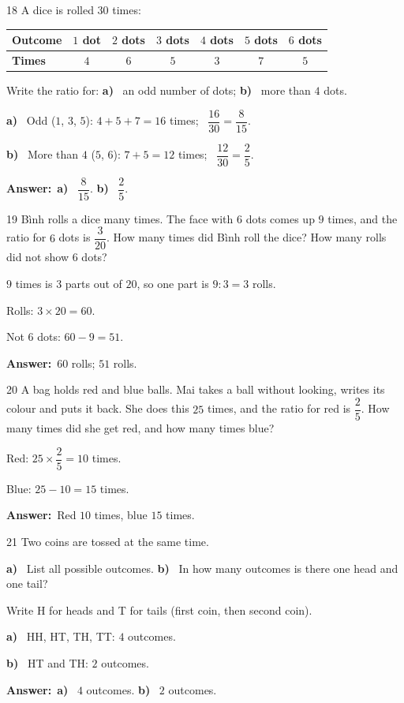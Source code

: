 \documentclass[11pt]{article}
\newif\ifsol \solfalse
\providecommand{\AnsWord}{Đáp số}
\newcommand{\dapso}[1]{\par\textbf{\AnsWord:}\ #1}
\newcommand{\probsol}[1]{%
  \begin{lrbox}{\solmeasure}\begin{minipage}{\dimexpr\linewidth-24pt\relax}#1\end{minipage}\end{lrbox}%
  \ifsol
    \begin{solbox}#1\end{solbox}%
  \else
    \setlength{\solht}{\dimexpr\ht\solmeasure+\dp\solmeasure+0.85cm\relax}%
    \ifdim\solht<1.35cm\setlength{\solht}{1.35cm}\fi
    \begin{tcolorbox}[colback=white,colframe=Line,boxrule=0.8pt,arc=5pt,
      left=8pt,right=8pt,top=4pt,bottom=4pt,height=\solht]{\footnotesize\color{Slate}\itshape\WorkWord}\end{tcolorbox}%
  \fi}
\newcommand{\pa}[1]{\textbf{#1)}\ }
\newcommand{\gap}{\vspace{0.3cm}}
\def\WorkWord{Your work:}
\def\AnsWord{Answer}
\begin{document}
\gap
\needspace{5cm}
\begin{probbox}{18}{\relax}
A dice is rolled $30$ times:
\begin{center}
\begin{tabular}{|l|c|c|c|c|c|c|}
\hline
\textbf{Outcome} & $1$ dot & $2$ dots & $3$ dots & $4$ dots & $5$ dots & $6$ dots\\\hline
\textbf{Times} & $4$ & $6$ & $5$ & $3$ & $7$ & $5$\\\hline
\end{tabular}
\end{center}
Write the ratio for: \pa{a} an odd number of dots; \quad \pa{b} more than $4$ dots.
\end{probbox}
\probsol{
\pa{a} Odd ($1$, $3$, $5$): $4+5+7=16$ times; \ $\dfrac{16}{30}=\dfrac{8}{15}$.\par
\pa{b} More than $4$ ($5$, $6$): $7+5=12$ times; \ $\dfrac{12}{30}=\dfrac25$.
\dapso{\pa{a} $\dfrac{8}{15}$. \pa{b} $\dfrac25$.}}
\gap
\begin{probbox}{19}{\relax}
Bình rolls a dice many times. The face with $6$ dots comes up $9$ times, and the ratio for $6$ dots is $\dfrac{3}{20}$. How many times did Bình roll the dice? How many rolls did not show $6$ dots?
\end{probbox}
\probsol{
$9$ times is $3$ parts out of $20$, so one part is $9:3=3$ rolls.\par Rolls: $3\times20=60$.\par Not $6$ dots: $60-9=51$.
\dapso{$60$ rolls; $51$ rolls.}}
\gap
\begin{probbox}{20}{\relax}
A bag holds red and blue balls. Mai takes a ball without looking, writes its colour and puts it back. She does this $25$ times, and the ratio for red is $\dfrac25$. How many times did she get red, and how many times blue?
\end{probbox}
\probsol{
Red: $25\times\dfrac25=10$ times.\par Blue: $25-10=15$ times.
\dapso{Red $10$ times, blue $15$ times.}}
\gap
\begin{probbox}{21}{\relax}
Two coins are tossed at the same time.\par
\pa{a} List all possible outcomes. \quad \pa{b} In how many outcomes is there one head and one tail?
\end{probbox}
\probsol{
Write H for heads and T for tails (first coin, then second coin).\par
\pa{a} HH, HT, TH, TT: $4$ outcomes.\par
\pa{b} HT and TH: $2$ outcomes.
\dapso{\pa{a} $4$ outcomes. \pa{b} $2$ outcomes.}}
\end{document}
